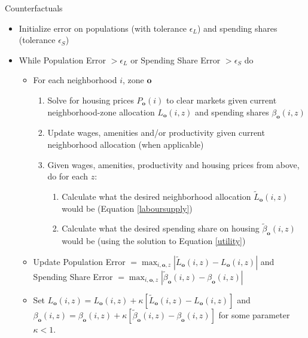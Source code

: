 \documentclass[12pt]{article}
\begin{document}
	\begin{algorithm}
		\caption{Counterfactuals}
		
		
		\begin{itemize}
			\item[] Initialize error on populations (with tolerance $\epsilon_{L}$) and spending shares (tolerance $\epsilon_{S}$)
			
			\item[] While Population Error $> \epsilon_{L}$ or Spending Share Error $ > \epsilon_{S}$ do
			
			\begin{itemize}
				\item[] For each neighborhood $i$, zone $\boldsymbol{o}$
			\begin{enumerate}			
					\item Solve for housing prices $P_{\boldsymbol{o}}(i)$ to clear markets given current neighborhood-zone allocation $L_{\boldsymbol{o}}(i, z)$ and spending shares $\beta_{\boldsymbol{o}}(i, z)$
				
				
					\item Update wages, amenities and/or productivity given current neighborhood allocation (when applicable)
				
				
					\item Given wages, amenities, productivity and housing prices from above, do for each $z$: 
				\begin{enumerate}
						\item Calculate what the desired neighborhood allocation $\tilde{L}_{\boldsymbol{o}}(i, z)$ would be (Equation \ref{laboursupply})
					
					
						\item Calculate what the desired spending share on housing $\tilde{\beta}_{\boldsymbol{o}}(i, z)$ would be (using the solution to Equation \ref{utility})
										
				\end{enumerate}
				

				
			\end{enumerate}
			\item[] Update Population Error $ = \max_{i, \boldsymbol{o}, z}|\tilde{L}_{\boldsymbol{o}}(i, z) - L_{\boldsymbol{o}}(i, z)|$ and Spending Share Error $ = \max_{i, \boldsymbol{o}, z}|\tilde{\beta}_{\boldsymbol{o}}(i, z) - \beta_{\boldsymbol{o}}(i, z)|$
			
			
			\item[] Set $L_{\boldsymbol{o}}(i, z) = L_{\boldsymbol{o}}(i, z) + \kappa [\tilde{L}_{\boldsymbol{o}}(i, z) - L_{\boldsymbol{o}}(i, z)]$ and $\beta_{\boldsymbol{o}}(i, z) = \beta_{\boldsymbol{o}}(i, z)  + \kappa[\tilde{\beta}_{\boldsymbol{o}}(i, z) - \beta_{\boldsymbol{o}}(i, z)]$ for some parameter $\kappa < 1$. 
			
		\end{itemize}	
			
		\end{itemize}
		
		
	\end{algorithm}
	
\end{document}
